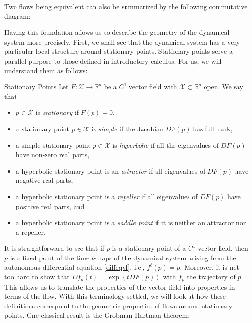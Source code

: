 \documentclass[11pt, a4paper]{memoir}
\theoremstyle{break}
\theoremstyle{break}
\theoremstyle{nonumberplain}
\newcommand{\mR}{\mathbb{R}}
\begin{document}
\noindent Two flows being equivalent can also be summarized by the following commutative diagram:
\begin{center}
\end{center}
Having this foundation allows us to describe the geometry of the dynamical system more precisely. First, we shall see that the dynamical system has a very particular local structure around stationary points. Stationary points serve a parallel purpose to those defined in introductory calculus. For us, we will understand them as follows:
\begin{mydefinition}{Stationary Points}
Let $F:\mathcal{X}\to \mR^d$ be a $C^1$ vector field with $\mathcal{X}\subset \mR^d$ open. We say that
\begin{itemize}
	\item $p\in \mathcal{X}$ is \emph{stationary} if $F(p)=0$,
	\item a stationary point $p\in \mathcal{X}$ is \emph{simple} if the Jacobian $DF(p)$ has full rank,
	\item a simple stationary point $p\in \mathcal{X}$ is \emph{hyperbolic} if all the eigenvalues of $DF(p)$ have non-zero real parts,
	\item a hyperbolic stationary point is an \emph{attractor} if all eigenvalues of $DF(p)$ have negative real parts,
	\item a hyperbolic stationary point is a \emph{repeller} if all eigenvalues of $DF(p)$ have positive real parts, and
	\item a hyperbolic stationary point is a \emph{saddle point} if it is neither an attractor nor a repeller.	
\end{itemize}
\end{mydefinition}
It is straightforward to see that if $p$ is a stationary point of a $C^1$ vector field, then $p$ is a fixed point of the time $t$-maps of the dynamical system arising from the autonomous differential equation \ref{diffeqvf}, i.e., $f^t(p)=p$. Moreover, it is not too hard to show that $Df_p(t)=\exp(tDF(p))$ with $f_p$ the trajectory of $p$. This allows us to translate the properties of the vector field into properties in terms of the flow. With this terminology settled, we will look at how these definitions correspond to the geometric properties of flows around stationary points. One classical result is the Grobman-Hartman theorem:
\end{document}
